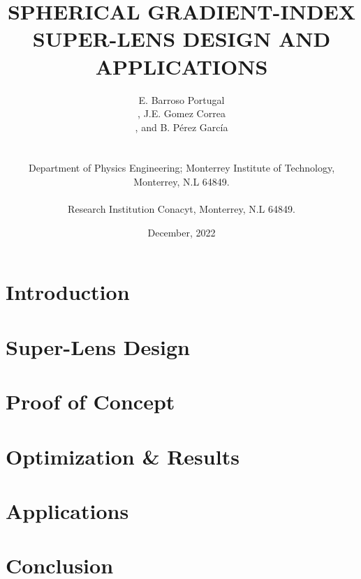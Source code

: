 \documentclass{document_layout}
\title{SPHERICAL GRADIENT-INDEX SUPER-LENS DESIGN AND APPLICATIONS}
\author{
    E. Barroso Portugal\address{1}, J.E. Gomez Correa \address{2}, and B. Pérez García\address{1} \\[0.5em]
    {\scriptsize
        \address{1} Department of Physics Engineering; Monterrey Institute of Technology, Monterrey, N.L 64849.\\
        \address{2} Research Institution Conacyt, Monterrey, N.L 64849. \\
    }
}
\date{December, 2022}
\begin{document}
\maketitle

    
\section*{Introduction}


\section{Super-Lens Design}


\section{Proof of Concept}


\section{Optimization \& Results}


\section{Applications}


\section{Conclusion}


\printbibliography
\end{document}
